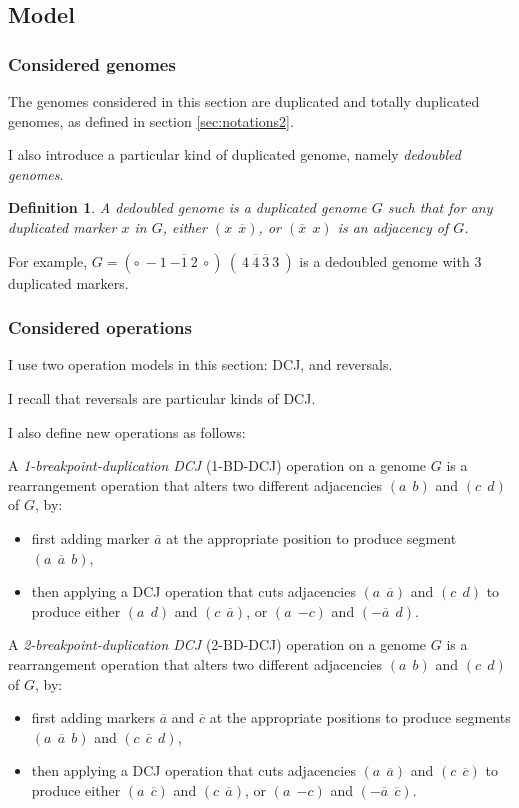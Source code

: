 \documentclass[11pt,final,twoside,nofrench]{thlifl}
\newcommand{\snd}[1]{ \ensuremath{\overline{#1}} }
\newcommand{\msnd}[1]{ \ensuremath{{-\overline{#1}}} }
\newtheorem{definition}{Definition}
\begin{document}
\subsection{Model}

\subsubsection{Considered genomes}

The genomes considered in this section are duplicated and totally duplicated genomes, as defined in section \ref{sec:notations2}.

I also introduce a particular kind of duplicated genome, namely \emph{dedoubled genomes}.

\begin{definition}
A \emph{dedoubled genome} is a duplicated genome $G$ such that for any
duplicated marker $x$ in $G$,  either $(x~~\snd{x})$,  or  $(\snd{x}~~x)$ is an
adjacency of $G$.
\end{definition}

For example, $G = (\circ~-1~\msnd{1}~2~\circ)~(~4~\snd{4}~\snd{3}~3~)$ is a dedoubled genome with 3 duplicated markers.

\subsubsection{Considered operations}

I use two operation models in this section: DCJ, and reversals.

I recall that reversals are particular kinds of DCJ.

I also define new operations as follows:

A \emph{1-breakpoint-duplication DCJ} (1-BD-DCJ) operation on a genome $G$ is 
a rearrangement operation that alters two different adjacencies $(a~~b)$  
and $(c~~d)$ of $G$, by:
\begin{itemize}
\item first adding marker $\snd{a}$  at the appropriate position to produce 
segment $(a~~\snd{a}~~b)$,
\item then applying a DCJ operation that cuts adjacencies $(a~~\snd{a})$ and 
$(c~~d)$ to produce either  $(a~~d)$ and $(c~~\snd{a})$, or  $(a~~{-c})$ and 
$(\msnd{a}~~d)$. 
\end{itemize}

A \emph{2-breakpoint-duplication DCJ} (2-BD-DCJ) operation on a genome $G$ 
is a rearrangement operation that alters two different adjacencies 
$(a~~b)$  and $(c~~d)$ of $G$, by:
\begin{itemize}
\item first adding markers  $\snd{a}$ and  $\snd{c}$ at the appropriate 
positions to produce segments  $(a~~\snd{a}~~b)$ and $(c~~\snd{c}~~d)$,
\item then applying a DCJ operation that cuts adjacencies $(a~~\snd{a})$ 
and $(c~~\snd{c})$ to produce either $(a~~\snd{c})$ and $(c~~\snd{a})$, or  
$(a~~{-c})$ and $(\msnd{a}~~\snd{c})$.
\end{itemize}
\end{document}
